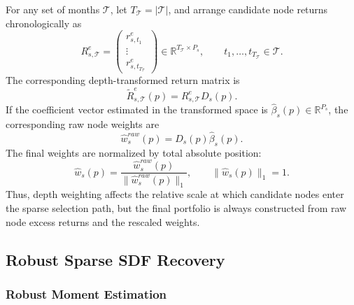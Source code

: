 \documentclass[12pt]{article}
\def\bm#1{#1}%
\def\mathrm#1{#1}%
\def\top{}%
\begin{document}
For any set of months \(\mathcal T\), let \(T_{\mathcal T}=|\mathcal T|\), and arrange candidate node returns chronologically as
\begin{equation}
  \bm R_{s,\mathcal T}^{e}
  =
  \begin{pmatrix}
    \bm r_{s,t_1}^{e\top}\\
    \vdots\\
    \bm r_{s,t_{T_{\mathcal T}}}^{e\top}
  \end{pmatrix}
  \in\mathbb R^{T_{\mathcal T}\times P_s},
  \qquad
  t_1,\ldots,t_{T_{\mathcal T}}\in\mathcal T.
  \label{eq:return_matrix_definition}
\end{equation}
The corresponding depth-transformed return matrix is
\begin{equation}
  \widetilde{\bm R}_{s,\mathcal T}^{e}(p)
  =
  \bm R_{s,\mathcal T}^{e}\bm D_s(p).
  \label{eq:transformed_return_matrix}
\end{equation}
If the coefficient vector estimated in the transformed space is
\(\widehat{\bm\beta}_s(p)\in\mathbb R^{P_s}\), the corresponding raw node weights are
\begin{equation}
  \widehat{\bm w}_{s}^{\mathrm{raw}}(p)
  =
  \bm D_s(p)\widehat{\bm\beta}_s(p).
  \label{eq:recover_original_weights}
\end{equation}
The final weights are normalized by total absolute position:
\begin{equation}
  \widehat{\bm w}_{s}(p)
  =
  \frac{\widehat{\bm w}_{s}^{\mathrm{raw}}(p)}
       {\bigl\|\widehat{\bm w}_{s}^{\mathrm{raw}}(p)\bigr\|_1},
  \qquad
  \bigl\|\widehat{\bm w}_{s}(p)\bigr\|_1=1.
  \label{eq:l1_weight_normalization}
\end{equation}
Thus, depth weighting affects the relative scale at which candidate nodes enter the sparse selection path, but the final portfolio is always constructed from raw node excess returns and the rescaled weights.

\subsection{Robust Sparse SDF Recovery}
\label{subsec:sparse_sdf}

\subsubsection{Robust Moment Estimation}
\end{document}
